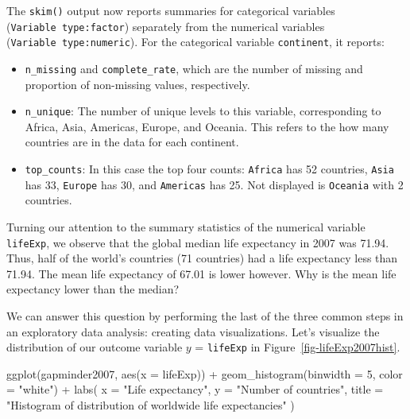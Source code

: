 \documentclass[
  letterpaper,
  DIV=11,
  numbers=noendperiod]{scrreprt}
\newenvironment{Shaded}{\begin{snugshade}}{\end{snugshade}}
\newcommand{\AttributeTok}[1]{\textcolor[rgb]{0.40,0.45,0.13}{#1}}
\newcommand{\DecValTok}[1]{\textcolor[rgb]{0.68,0.00,0.00}{#1}}
\newcommand{\FunctionTok}[1]{\textcolor[rgb]{0.28,0.35,0.67}{#1}}
\newcommand{\NormalTok}[1]{\textcolor[rgb]{0.00,0.23,0.31}{#1}}
\newcommand{\SpecialCharTok}[1]{\textcolor[rgb]{0.37,0.37,0.37}{#1}}
\newcommand{\StringTok}[1]{\textcolor[rgb]{0.13,0.47,0.30}{#1}}
\theoremstyle{definition}
\theoremstyle{remark}
\begin{document}
The \texttt{skim()} output now reports summaries for categorical
variables (\texttt{Variable\ type:factor}) separately from the numerical
variables (\texttt{Variable\ type:numeric}). For the categorical
variable \texttt{continent}, it reports:

\begin{itemize}
\item
  \texttt{n\_missing} and \texttt{complete\_rate}, which are the number
  of missing and proportion of non-missing values, respectively.
\item
  \texttt{n\_unique}: The number of unique levels to this variable,
  corresponding to Africa, Asia, Americas, Europe, and Oceania. This
  refers to the how many countries are in the data for each continent.
\item
  \texttt{top\_counts}: In this case the top four counts:
  \texttt{Africa} has 52 countries, \texttt{Asia} has 33,
  \texttt{Europe} has 30, and \texttt{Americas} has 25. Not displayed is
  \texttt{Oceania} with 2 countries.
\end{itemize}

Turning our attention to the summary statistics of the numerical
variable \texttt{lifeExp}, we observe that the global median life
expectancy in 2007 was 71.94. Thus, half of the world's countries (71
countries) had a life expectancy less than 71.94. The mean life
expectancy of 67.01 is lower however. Why is the mean life expectancy
lower than the median?

We can answer this question by performing the last of the three common
steps in an exploratory data analysis: creating data visualizations.
Let's visualize the distribution of our outcome variable \(y\) =
\texttt{lifeExp} in Figure~\ref{fig-lifeExp2007hist}.

\begin{Shaded}
\begin{Highlighting}[]
\FunctionTok{ggplot}\NormalTok{(gapminder2007, }\FunctionTok{aes}\NormalTok{(}\AttributeTok{x =}\NormalTok{ lifeExp)) }\SpecialCharTok{+}
  \FunctionTok{geom\_histogram}\NormalTok{(}\AttributeTok{binwidth =} \DecValTok{5}\NormalTok{, }\AttributeTok{color =} \StringTok{"white"}\NormalTok{) }\SpecialCharTok{+}
  \FunctionTok{labs}\NormalTok{(}
    \AttributeTok{x =} \StringTok{"Life expectancy"}\NormalTok{, }
    \AttributeTok{y =} \StringTok{"Number of countries"}\NormalTok{,}
    \AttributeTok{title =} \StringTok{"Histogram of distribution of worldwide life expectancies"}
\NormalTok{    )}
\end{Highlighting}
\end{Shaded}
\end{document}
